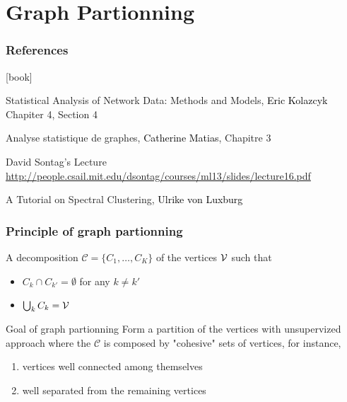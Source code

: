 \documentclass{beamer}\usepackage[]{graphicx}\usepackage[]{color}
\begin{document}
\section{Graph Partionning}

\begin{frame} 
  \frametitle{References}

    \begin{thebibliography}{99}
      [book]

     Statistical Analysis of Network Data: Methods and Models,
    \newblock \textcolor{black}{Eric Kolazcyk}
    \newblock \alert{Chapiter 4, Section 4}

     Analyse statistique de graphes, 
    \newblock \textcolor{black}{Catherine Matias}, \alert{Chapitre 3}

     David Sontag's Lecture
    \newblock \url{http://people.csail.mit.edu/dsontag/courses/ml13/slides/lecture16.pdf}
    
     A Tutorial on Spectral Clustering, 
    \newblock \textcolor{black}{Ulrike von Luxburg}

    \end{thebibliography}

\end{frame}

\begin{frame}
  \frametitle{Principle of graph partionning}

  \begin{definition}[Partition]
    A decomposition $\mathcal{C} = \{C_1,\dots,C_K\}$ of the vertices $\mathcal{V}$ such that
    \begin{itemize}
      \item $C_k \cap C_{k'} = \emptyset$ for any $k\neq k'$
      \item $\bigcup_{k} C_k = \mathcal{V}$
    \end{itemize}
  \end{definition}

  \vfill

  \begin{block}{Goal of graph partionning}
    Form a partition of the vertices with unsupervized approach where the $\mathcal{C}$ is composed by \alert{"cohesive"} sets of vertices, for instance,
    \begin{enumerate}
      \item vertices well connected among themselves
      \item well separated from the remaining vertices
    \end{enumerate}
    
  \end{block}

\end{frame}
\end{document}
